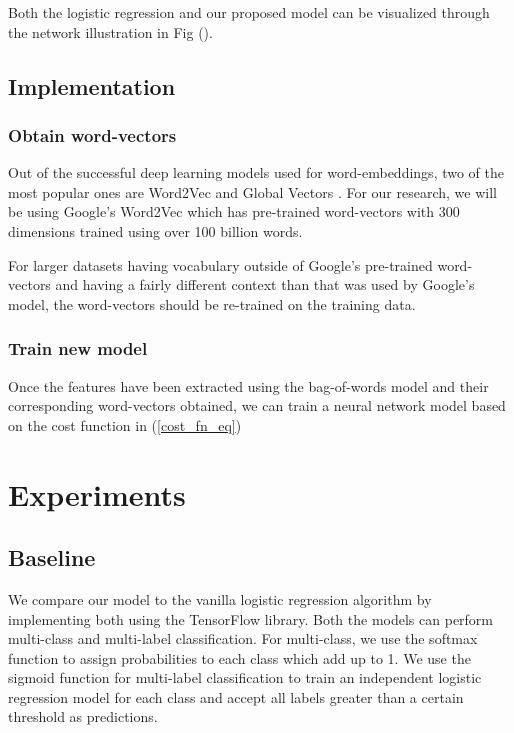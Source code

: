 Both the logistic regression and our proposed model can be visualized through the network illustration in Fig ().

\section{Implementation}

\subsection{Obtain word-vectors}

Out of the successful deep learning models used for word-embeddings, two of the most popular ones are Word2Vec \cite{le2014distributed} and Global Vectors \cite{pennington2014glove}. For our research, we will be using Google's Word2Vec which has pre-trained word-vectors with 300 dimensions trained using over 100 billion words. 

For larger datasets having vocabulary outside of Google's pre-trained word-vectors and having a fairly different context than that was used by Google's model, the word-vectors should be re-trained on the training data.

\subsection{Train new model}

Once the features have been extracted using the bag-of-words model and their corresponding word-vectors obtained, we can train a neural network model based on the cost function in (\ref{cost_fn_eq})

\chapter{Experiments}

\section{Baseline}

We compare our model to the vanilla logistic regression algorithm by implementing both using the TensorFlow library. Both the models can perform multi-class and multi-label classification. For multi-class, we use the softmax function to assign probabilities to each class which add up to 1. We use the sigmoid function for multi-label classification to train an independent logistic regression model for each class and accept all labels greater than a certain threshold as predictions.

